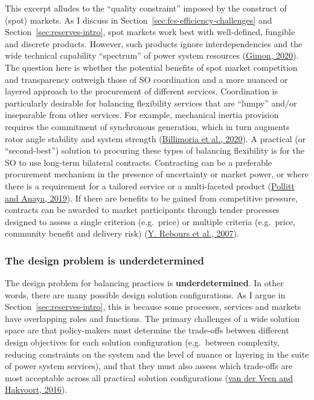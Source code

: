 \documentclass[12pt,a4paper,]{report}
\begin{document}
This excerpt alludes to the ``quality constraint'' imposed by the
construct of (spot) markets. As I discuss in
Section~\ref{sec:fcs-efficiency-challenges} and
Section~\ref{sec:reserves-intro}, spot markets work best with
well-defined, fungible and discrete products. However, such products
ignore interdependencies and the wide technical capability ``spectrum''
of power system resources
(\protect\hyperlink{ref-gimonGridPhysicsMarkets2020}{Gimon, 2020}). The
question here is whether the potential benefits of spot market
competition and transparency outweigh those of SO coordination and a
more nuanced or layered approach to the procurement of different
services. Coordination is particularly desirable for balancing
flexibility services that are ``lumpy'' and/or inseparable from other
services. For example, mechanical inertia provision requires the
commitment of synchronous generation, which in turn augments rotor angle
stability and system strength
(\protect\hyperlink{ref-billimoriaMarketDesignSystem2020}{Billimoria et
al., 2020}). A practical (or ``second-best'') solution to procuring
these types of balancing flexibility is for the SO to use long-term
bilateral contracts. Contracting can be a preferable procurement
mechanism in the presence of uncertainty or market power, or where there
is a requirement for a tailored service or a multi-faceted product
(\protect\hyperlink{ref-pollittCompetitionMarketsAncillary2019}{Pollitt
and Anaya, 2019}). If there are benefits to be gained from competitive
pressure, contracts can be awarded to market participants through tender
processes designed to assess a single criterion (e.g.~price) or multiple
criteria (e.g.~price, community benefit and delivery risk)
(\protect\hyperlink{ref-reboursFundamentalDesignIssues2007}{Y. Rebours
et al., 2007}).

\hypertarget{the-design-problem-is-underdetermined}{%
\subsubsection{The design problem is
underdetermined}\label{the-design-problem-is-underdetermined}}

The design problem for balancing practices is \textbf{underdetermined}.
In other words, there are many possible design solution configurations.
As I argue in Section~\ref{sec:reserves-intro}, this is because some
processes, services and markets have overlapping roles and functions.
The primary challenges of a wide solution space are that policy-makers
must determine the trade-offs between different design objectives for
each solution configuration (e.g.~between complexity, reducing
constraints on the system and the level of nuance or layering in the
suite of power system services), and that they must also assess which
trade-offs are most acceptable across all practical solution
configurations
(\protect\hyperlink{ref-vanderveenElectricityBalancingMarket2016}{van
der Veen and Hakvoort, 2016}).
\end{document}
